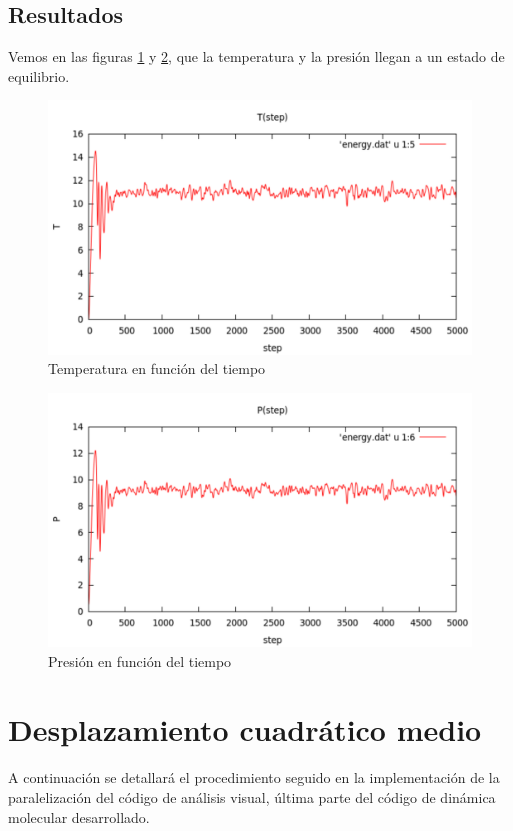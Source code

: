 \documentclass[onecolumn]{article}
\begin{document}
\subsection{Resultados}
Vemos en las figuras \ref{fig:tempe} y \ref{fig:presion}, que la temperatura y la presión llegan a un estado de equilibrio.
\begin{figure}[h!]
\includegraphics[scale=0.50]{temperatura.pdf} 
\caption{Temperatura en función del tiempo} 
\label{fig:tempe}
\end{figure}\begin{figure}[h!]
\includegraphics[scale=0.50]{presion.pdf} 
\caption{Presión en función del tiempo} 
\label{fig:presion}
\end{figure}


\section{Desplazamiento cuadrático medio}

A continuación se detallará el procedimiento seguido en la implementación de la paralelización del código de análisis visual, última parte del código de dinámica molecular desarrollado.
\end{document}
